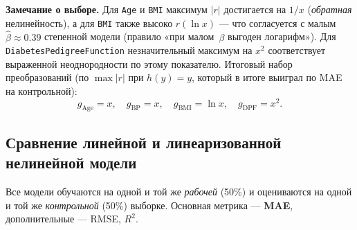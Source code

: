 \documentclass[a4paper, 14pt]{extarticle}
\begin{document}
\textbf{Замечание о выборе.} Для \texttt{Age} и \texttt{BMI} максимум $|r|$ достигается на $1/x$
(\textit{обратная} нелинейность), а для \texttt{BMI} также высоко $r(\ln x)$ --- что согласуется с
малым $\hat\beta \approx 0.39$ степенной модели (правило «при малом~$\beta$ выгоден логарифм»).
Для \texttt{DiabetesPedigreeFunction} незначительный максимум на $x^2$ соответствует выраженной
неоднородности по этому показателю. Итоговый набор преобразований (по $\max|r|$ при $h(y)=y$,
который в итоге выиграл по MAE на контрольной):
\[
g_{\text{Age}}=x,\quad g_{\text{BP}}=x,\quad g_{\text{BMI}}=\ln x,\quad g_{\text{DPF}}=x^{2}.
\]

\subsection{Сравнение линейной и линеаризованной нелинейной модели}\label{sec:nl-compare}

Все модели обучаются на одной и той же \textit{рабочей} (50\%) и оцениваются на одной и той же
\textit{контрольной} (50\%) выборке. Основная метрика --- \textbf{MAE}, дополнительные --- RMSE, $R^{2}$.

\begin{table}[H]
\centering\footnotesize
{}
\caption{Сравнение базовой линейной и шести вариантов линеаризованной нелинейной модели по MAE, RMSE и $R^2$
на одной и той же выборке 50/50 (после удаления $5$ записей с \texttt{Glucose}$=0$). Жирным выделена выигравшая по всем трём метрикам на контрольной модель.}
\label{tab:lin-vs-nl}
\end{table}
\end{document}
